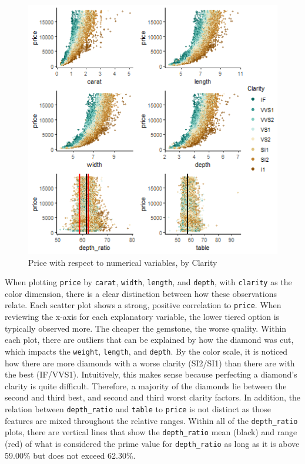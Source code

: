 \documentclass[
  paper=a4,
  ,captions=tableheading
]{scrartcl}
\begin{document}
\begin{figure}[H]

{\centering \includegraphics[width=\linewidth,]{Diamonds_PDF_files/figure-latex/Price by X and Clarity-1} 

}

\caption{Price with respect to numerical variables, by Clarity}\label{fig:Price by X and Clarity}
\end{figure}

When plotting \texttt{price} by \texttt{carat}, \texttt{width},
\texttt{length}, and \texttt{depth}, with \texttt{clarity} as the color
dimension, there is a clear distinction between how these observations
relate. Each scatter plot shows a strong, positive correlation to
\texttt{price}. When reviewing the x-axis for each explanatory variable,
the lower tiered option is typically observed more. The cheaper the
gemstone, the worse quality. Within each plot, there are outliers that
can be explained by how the diamond was cut, which impacts the
\texttt{weight}, \texttt{length}, and \texttt{depth}. By the color
scale, it is noticed how there are more diamonds with a worse clarity
(SI2/SI1) than there are with the best (IF/VVS1). Intuitively, this
makes sense because perfecting a diamond's clarity is quite difficult.
Therefore, a majority of the diamonds lie between the second and third
best, and second and third worst clarity factors. In addition, the
relation between \texttt{depth\_ratio} and \texttt{table} to
\texttt{price} is not distinct as those features are mixed throughout
the relative ranges. Within all of the \texttt{depth\_ratio} plots,
there are vertical lines that show the \texttt{depth\_ratio} mean
(black) and range (red) of what is considered the prime value for
\texttt{depth\_ratio} as long as it is above 59.00\% but does not exceed
62.30\%.
\end{document}

